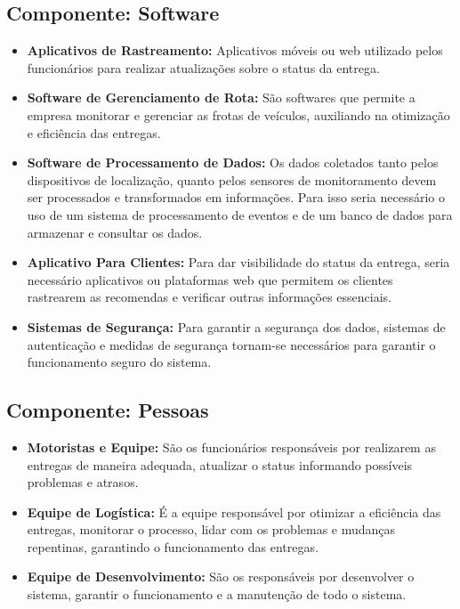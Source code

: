      \subsection{Componente: Software}
     \begin{itemize}
     	\item \textbf{Aplicativos de Rastreamento:} Aplicativos móveis ou web utilizado pelos funcionários para realizar atualizações sobre o status da entrega.
     	
     	\item \textbf{Software de Gerenciamento de Rota:} São softwares que permite a empresa monitorar e gerenciar as frotas de veículos, auxiliando na otimização e eficiência das entregas.
     	
     	\item \textbf{Software de Processamento de Dados:} Os dados coletados tanto pelos dispositivos de localização, quanto pelos sensores de monitoramento devem ser processados e transformados em informações. Para isso seria necessário o uso de um sistema de processamento de eventos e de um banco de dados para armazenar e consultar os dados.
     	
     	\item \textbf{Aplicativo Para Clientes:} Para dar visibilidade do status da entrega, seria necessário aplicativos ou plataformas web que permitem os clientes rastrearem as recomendas e verificar outras informações essenciais. 
     	
     	\item \textbf{Sistemas de Segurança:} Para garantir a segurança dos dados, sistemas de autenticação e medidas de segurança tornam-se necessários para garantir o funcionamento seguro do sistema.
     \end{itemize}
     

     \subsection{Componente: Pessoas}
	 \begin{itemize}
	 	\item \textbf{Motoristas e Equipe:} São os funcionários responsáveis por realizarem as entregas de maneira adequada, atualizar o status informando possíveis problemas e atrasos.
	 	
	 	\item \textbf{Equipe de Logística:} É a equipe responsável por otimizar a eficiência das entregas, monitorar o processo, lidar com os problemas e mudanças repentinas, garantindo o funcionamento das entregas.
	 	
	 	\item \textbf{Equipe de Desenvolvimento:} São os responsáveis por desenvolver o sistema, garantir o funcionamento e a manutenção de todo o sistema. 
	 \end{itemize}



